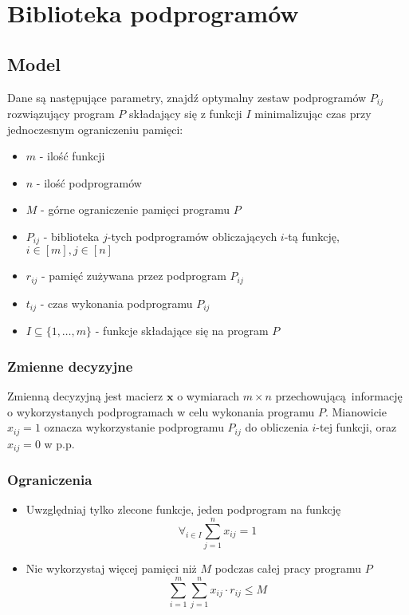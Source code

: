 \section{Biblioteka podprogramów}

\subsection{Model}
Dane są następujące parametry, znajdź optymalny zestaw podprogramów $P_{ij}$ rozwiązujący program $P$ składający się z funkcji $I$ minimalizując czas przy jednoczesnym ograniczeniu pamięci:
\begin{itemize}
    \item $m$ - ilość funkcji
    \item $n$ - ilość podprogramów
    \item $M$ - górne ograniczenie pamięci programu $P$
    \item $P_{ij}$ - biblioteka $j$-tych podprogramów obliczających $i$-tą funkcję, $i\in[m], j\in[n]$
    \item $r_{ij}$ - pamięć zużywana przez podprogram $P_{ij}$
    \item $t_{ij}$ - czas wykonania podprogramu $P_{ij}$
    \item $I \subseteq \{1,\ldots,m\}$ - funkcje składające się na program $P$
\end{itemize}

\subsubsection{Zmienne decyzyjne}
Zmienną decyzyjną jest macierz $\mathbf{x}$ o wymiarach $m \times n$ przechowującą informację o wykorzystanych podprogramach w celu wykonania programu $P$.  Mianowicie $x_{ij} = 1$ oznacza wykorzystanie podprogramu $P_{ij}$ do obliczenia $i$-tej funkcji, oraz $x_{ij} = 0$ w p.p.

\subsubsection{Ograniczenia}
\begin{itemize}
    \item Uwzględniaj tylko zlecone funkcje, jeden podprogram na funkcję $$ \forall_{i\in I} \sum_{j=1}^{n} x_{ij} = 1 $$
    \item Nie wykorzystaj więcej pamięci niż $M$ podczas całej pracy programu $P$
    $$ \sum_{i=1}^{m} \sum_{j=1}^{n} x_{ij} \cdot r_{ij} \leq M $$
\end{itemize}

